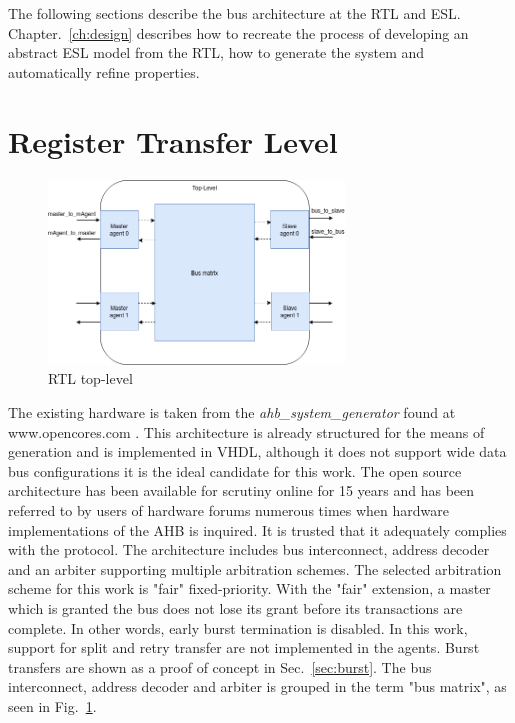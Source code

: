 The following sections describe the bus architecture at the RTL and ESL. Chapter.~\ref{ch:design} describes how to recreate the process of developing an abstract ESL model from the RTL, how to generate the system and automatically refine properties.  
\newpage

\section{Register Transfer Level}
\begin{figure}[hbt]
    \begin{center}
        \includegraphics[width=0.7\textwidth]{figs/hw/rtl_toplev.png}
    \end{center}
    \caption{RTL top-level}
    \label{fig:rtl-top}
\end{figure}


The existing hardware is taken from the \textit{ahb\_system\_generator} found at \\
 www.opencores.com \cite{ahbsys}. This architecture is already structured for the means of generation and is implemented in VHDL, although it does not support wide data bus configurations it is the ideal candidate for this work. The open source architecture has been available for scrutiny online for 15 years and has been referred to by users of hardware forums numerous times when hardware implementations of the AHB is inquired. It is trusted that it adequately complies with the protocol. The architecture includes bus interconnect, address decoder and an arbiter supporting multiple arbitration schemes. The selected arbitration scheme for this work is "fair" fixed-priority. With the "fair" extension, a master which is granted the bus does not lose its grant before its transactions are complete. In other words, early burst termination is disabled. In this work, support for split and retry transfer are not implemented in the agents. Burst transfers are shown as a proof of concept in Sec.~\ref{sec:burst}. The bus interconnect, address decoder and arbiter is grouped in the term "bus matrix", as seen in Fig.~\ref{fig:rtl-top}.\par   

